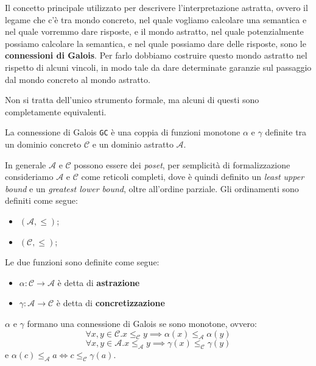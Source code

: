 Il concetto principale utilizzato per descrivere l'interpretazione astratta,
ovvero il legame che c'è tra mondo concreto, nel quale vogliamo calcolare una 
semantica e nel quale vorremmo dare risposte, e il mondo astratto,
nel quale potenzialmente possiamo calcolare la semantica, e nel quale possiamo 
dare delle risposte, sono le \textbf{connessioni di Galois}.
Per farlo dobbiamo costruire questo mondo astratto nel rispetto di 
alcuni vincoli, in modo tale da dare determinate garanzie sul passaggio dal mondo 
concreto al mondo astratto.

Non si tratta dell'unico strumento formale, ma alcuni di questi sono 
completamente equivalenti.

\begin{tcolorbox}[title = Connessione di Galois]
    La connessione di Galois \texttt{GC} è una coppia di funzioni monotone 
    $\alpha$ e $\gamma$ definite tra un dominio concreto $\mathcal{C}$ e un dominio
    astratto $\mathcal{A}$.
\end{tcolorbox}
In generale $\mathcal{A}$ e $\mathcal{C}$ possono essere dei \textit{poset}, per semplicità di 
formalizzazione consideriamo $\mathcal{A}$ e $\mathcal{C}$ come reticoli completi, dove è quindi 
definito un \textit{least upper bound} e un \textit{greatest lower bound}, oltre 
all'ordine parziale. Gli ordinamenti sono definiti come segue:
\begin{itemize}
    \item $(\mathcal{A}, \leq)$;
    \item $(\mathcal{C}, \leq)$;
\end{itemize}

Le due funzioni sono definite come segue:
\begin{itemize}
    \item $\alpha: \mathcal{C} \rightarrow \mathcal{A}$ è detta di \textbf{astrazione}
    \item $\gamma: \mathcal{A} \rightarrow \mathcal{C}$ è detta di \textbf{concretizzazione}
\end{itemize}
$\alpha$ e $\gamma$ formano una connessione di Galois se sono monotone, ovvero: 
\[
    \forall x, y \in \mathcal{C} . x \leq_\mathcal{C} y \implies \alpha(x) \leq_\mathcal{A} \alpha(y)
\]
\[
    \forall x, y \in \mathcal{A} . x \leq_\mathcal{A} y \implies \gamma(x) \leq_\mathcal{C} \gamma(y)
\]
e $\alpha(c) \leq_\mathcal{A} a \iff c \leq_\mathcal{C} \gamma(a)$.

